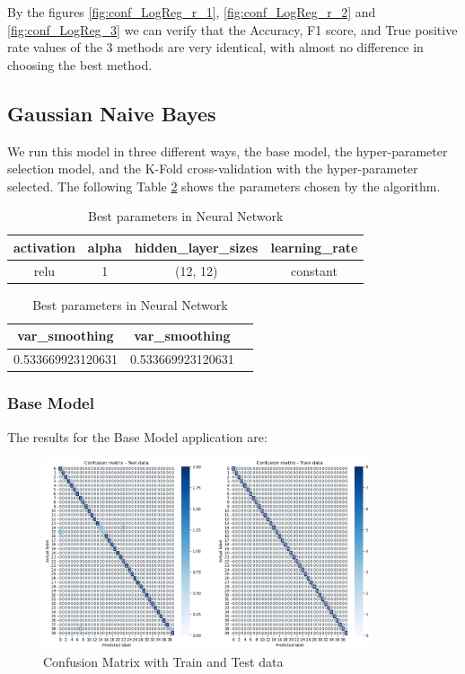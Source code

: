 \documentclass[conference]{IEEEtran}
\begin{document}
By the figures  \ref{fig:conf_LogReg_r_1}, \ref{fig:conf_LogReg_r_2} and \ref{fig:conf_LogReg_3} we can verify that the Accuracy, F1 score, and True positive rate values of the 3 methods are very identical, with almost no difference in choosing the best method.

\subsection{Gaussian Naive Bayes}

We run this model in three different ways, the base model, the hyper-parameter selection model, and the K-Fold cross-validation with the hyper-parameter selected. The following Table \ref{tab:tab2} shows the parameters chosen by the algorithm.

\begin{table}[h!]
    \centering
    \caption{Best parameters in Neural Network} 
    \begin{tabular}{||c c c c||} 
     \hline
     activation & alpha & hidden\_layer\_sizes & learning\_rate \\[0.5ex] 
     \hline\hline
     relu & 1 & (12, 12) & constant \\ 
    \hline
    \end{tabular}
    \begin{tabular}{||c c c||}
    \hline
    var_smoothing & var_smoothing \\ [0.5ex] 
    \hline\hline
     0.533669923120631 & 0.533669923120631 \\ 
    \hline
    \end{tabular}
    \label{tab:tab2}
\end{table}
\subsubsection{Base Model}
The results for the Base Model application are:

\begin{figure}[!h!]
    \includegraphics[width=3.8in]{GNB/1.png}%
    \caption{Confusion Matrix with Train and Test data}%
    \label{fig:conf_gnb_1}%
\end{figure}
\end{document}
